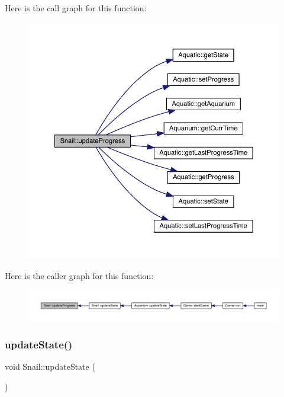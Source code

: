 Here is the call graph for this function\+:\nopagebreak
\begin{figure}[H]
\begin{center}
\leavevmode
\includegraphics[width=350pt]{class_snail_a327c2d31017320c4cd18b48103905fa7_cgraph}
\end{center}
\end{figure}
Here is the caller graph for this function\+:\nopagebreak
\begin{figure}[H]
\begin{center}
\leavevmode
\includegraphics[width=350pt]{class_snail_a327c2d31017320c4cd18b48103905fa7_icgraph}
\end{center}
\end{figure}
\mbox{\label{class_snail_a46dbefb10308c29341d96423e853cb2b}} 
\subsubsection{\texorpdfstring{update\+State()}{updateState()}}
{\footnotesize\ttfamily void Snail\+::update\+State (\begin{DoxyParamCaption}{ }\end{DoxyParamCaption})\hspace{0.3cm}{\ttfamily [virtual]}}



